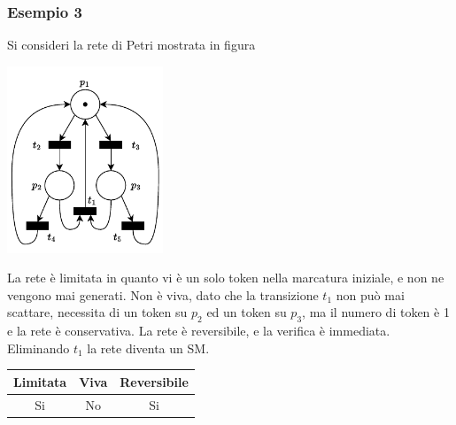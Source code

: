 \documentclass[10pt, letterpaper]{report}
\begin{document}
\subsubsection{Esempio 3}
Si consideri la rete di Petri mostrata in figura
\begin{center}
    \includegraphics[width=0.35\textwidth]{images/PetriEs3.drawio.pdf}
\end{center}
La rete è limitata in quanto vi è un solo token nella marcatura iniziale, e non ne vengono mai generati. Non è viva, dato che la transizione $t_1$ non può mai scattare, necessita di un token su $p_2$ ed un token su $p_3$, ma il numero di token è 1 e la rete è conservativa. La rete è reversibile, e la verifica è immediata. Eliminando $t_1$ la rete diventa un SM.
\begin{center}
    \begin{tabular}{|c|c|c|}
        \hline
        \rowcolor[HTML]{EFEFEF} 
        Limitata & Viva & Reversibile \\ \hline
        Si       & No   & Si          \\ \hline
        \end{tabular}
\end{center}
\end{document}
